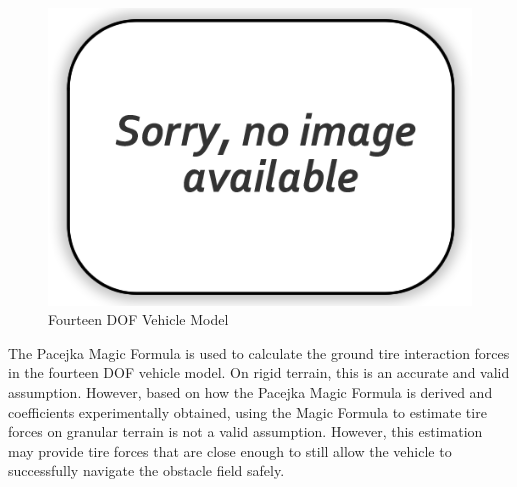 \documentclass[12pt,twocolumn]{article}
\begin{document}
\begin{figure}
	\centering
	\includegraphics[width=\columnwidth]{Figs/no-image.png}
	\caption{\small Fourteen DOF Vehicle Model}  
	\label{fig:14DOF}
\end{figure}

The Pacejka Magic Formula is used to calculate the ground tire interaction forces in the fourteen DOF vehicle model. On rigid terrain, this is an accurate and valid assumption. However, based on how the Pacejka Magic Formula is derived and coefficients experimentally obtained, using the Magic Formula to estimate tire forces on granular terrain is not a valid assumption. However, this estimation may provide tire forces that are close enough to still allow the vehicle to successfully navigate the obstacle field safely. 


\end{document}
